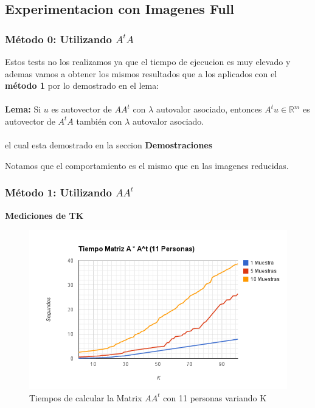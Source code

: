\subsection{Experimentacion con Imagenes Full}

\subsubsection{M\'etodo 0: Utilizando $A^tA$}

Estos tests no los realizamos ya que el tiempo de ejecucion es muy elevado y ademas vamos  a obtener
los mismos resultados que a los aplicados con el \textbf{m\'etodo 1} por lo demostrado en el lema: \\
\\ \textbf{Lema:} Si $u$ es autovector de $A A^t$ con $\lambda$ autovalor asociado, entonces $A^t u
\in \mathbb{R}^m$ es autovector de $A^t A$ también con $\lambda$ autovalor asociado.  \\ \\ el cual
esta demostrado en la seccion \textbf{Demostraciones}
 
Notamos que el comportamiento es el mismo que en las imagenes reducidas.

\subsubsection{M\'etodo 1: Utilizando $AA^t$}

\textbf{Mediciones de TK}

\begin{figure}[H] \includegraphics[width=1\textwidth]{img/imagef1.png} \caption{Tiempos de calcular
    la Matrix $AA^t$ con 11 personas variando K} \end{figure}

